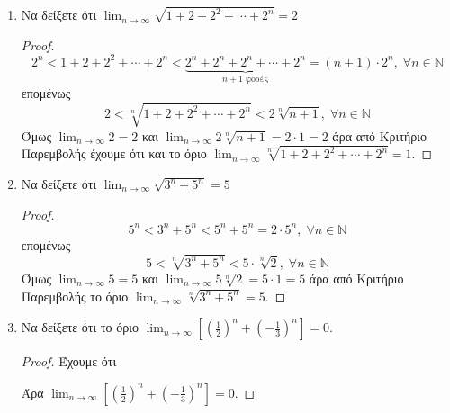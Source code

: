 \begin{enumerate}
    \item Να δείξετε ότι $ \lim_{n \to \infty} \sqrt{1+2+2^{2}+\cdots+2^{n}} = 2 $
      \begin{proof}
        \[
          2^{n} < 1+2+2^{2}+\cdots + 2^{n} < 
          \underbrace{2^{n}+2^{n}+2^{n}+\cdots +2^{n}}_{n+1\; \text{φορές}}= (n+1)
          \cdot 2^{n}, \; \forall n \in \mathbb{N}
        \] 
        επομένως
        \[
          2 < \sqrt[n]{1+2+2^{2}+\cdots+2^{n}} < 2 \sqrt[n]{n+1} , \; \forall n \in
          \mathbb{N} 
        \] 
        Όμως $ \lim_{n \to \infty} 2 = 2 $ και $ \lim_{n \to \infty} 2\sqrt[n]{n+1} = 2
        \cdot 1 = 2 $
        άρα από Κριτήριο Παρεμβολής έχουμε ότι και το όριο
        $ \lim_{n \to \infty} \sqrt[n]{1+2+2^{2}+\cdots+2^{n}} = 1 $.
      \end{proof}

    \item Να δείξετε ότι $ \lim_{n \to \infty} \sqrt{3^{n}+5^{n}} = 5 $
      \begin{proof}
       \[
         5^{n} < 3^{n}+5^{n} < 5^{n}+5^{n} = 2\cdot 5^{n}, \; \forall n \in \mathbb{N} 
        \] 
        επομένως
        \[
          5 < \sqrt[n]{3^{n}+5^{n}} < 5\cdot \sqrt[n]{2} , \; \forall n \in \mathbb{N}
         \] 
        Όμως $ \lim_{n \to \infty} 5 = 5 $ και $ \lim_{n \to \infty} 5\sqrt[n]{2} = 5
        \cdot 1 = 5 $
        άρα από Κριτήριο Παρεμβολής το όριο
        $ \lim_{n \to \infty} \sqrt[n]{3^{n}+5^{n}} = 5 $.
      \end{proof}

    \item Να δείξετε ότι το όριο $ \lim_{n \to \infty} \left[(\frac{1}{2} )^{n}+
      (-\frac{1}{3} )^{n}\right] = 0 $.
      \begin{proof}
        Έχουμε ότι 
        Άρα $ \lim_{n \to \infty} \left[(\frac{1}{2} )^{n}+
      (-\frac{1}{3} )^{n}\right] = 0 $.
      \end{proof}


\end{enumerate}
